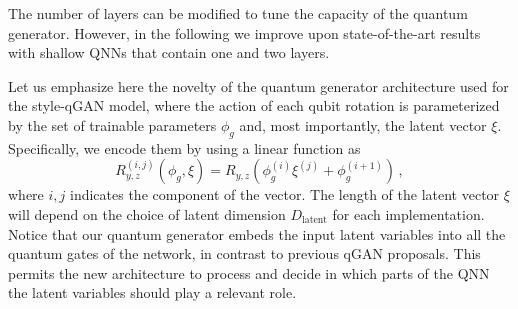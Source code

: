\documentclass[twocolumn,preprintnumbers,superscriptaddress]{revtex4-2}
\newcommand{\commentCBP}[1]{{\color{red} {[C: #1]}}}
\newcommand{\commentAF}[1]{{\color{cyan} {[A: #1]}}}
\newcommand{\commentDMG}[1]{{\color{orange} {[D: #1]}}}
\begin{document}
The number of layers can be modified to tune the capacity of the quantum generator. However, in the following we improve upon state-of-the-art results with shallow QNNs that contain one and two layers.

Let us emphasize here the novelty of the quantum generator architecture used for the style-qGAN model, where the action of each qubit rotation is parameterized by the set of trainable parameters $\phi_g$ and, most importantly, the latent vector $\xi$. Specifically, we encode them by using a linear function as
\begin{equation}
    \label{eq:rotation} R_{y,z}^{(i,j)}\left(\phi_g, \xi\right) = R_{y,z}\left(\phi_g^{(i)} \xi^{(j)} + \phi_g^{(i+1)}\right)\,,
\end{equation}
where $i,j$ indicates the component of the vector. The length of the latent vector $\xi$ will depend on the choice of latent dimension $D_{\mathrm{latent}}$ for each implementation. Notice that our quantum generator embeds the input latent variables into all the quantum gates of the network, in contrast to previous qGAN proposals. This permits the new architecture to process and decide in which
parts of the QNN the latent variables should play a relevant role.
\end{document}
